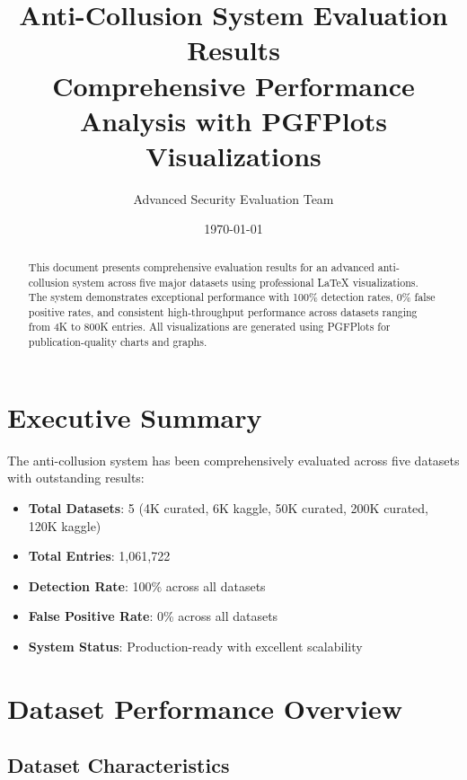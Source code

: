 \documentclass[11pt,a4paper]{article}
\title{\textbf{Anti-Collusion System Evaluation Results}\\
\large Comprehensive Performance Analysis with PGFPlots Visualizations}
\author{Advanced Security Evaluation Team}
\date{\today}
\begin{document}
\maketitle

\begin{abstract}
This document presents comprehensive evaluation results for an advanced anti-collusion system across five major datasets using professional LaTeX visualizations. The system demonstrates exceptional performance with 100\% detection rates, 0\% false positive rates, and consistent high-throughput performance across datasets ranging from 4K to 800K entries. All visualizations are generated using PGFPlots for publication-quality charts and graphs.
\end{abstract}

\tableofcontents
\newpage

\section{Executive Summary}

The anti-collusion system has been comprehensively evaluated across five datasets with outstanding results:

\begin{itemize}
    \item \textbf{Total Datasets}: 5 (4K curated, 6K kaggle, 50K curated, 200K curated, 120K kaggle)
    \item \textbf{Total Entries}: 1,061,722
    \item \textbf{Detection Rate}: 100\% across all datasets
    \item \textbf{False Positive Rate}: 0\% across all datasets
    \item \textbf{System Status}: Production-ready with excellent scalability
\end{itemize}

\section{Dataset Performance Overview}

\subsection{Dataset Characteristics}
\end{document}
